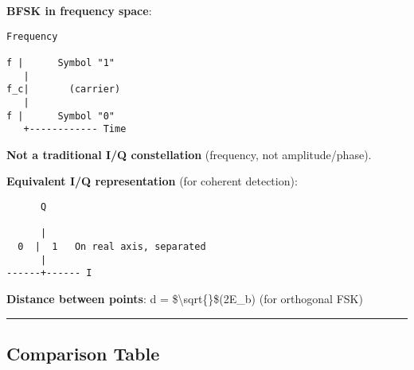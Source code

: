 \textbf{BFSK in frequency space}:

\begin{verbatim}
Frequency
   
f |      Symbol "1"
   |
f_c|       (carrier)
   |
f |      Symbol "0"
   +------------ Time
\end{verbatim}

\textbf{Not a traditional I/Q constellation} (frequency, not
amplitude/phase).

\textbf{Equivalent I/Q representation} (for coherent detection):

\begin{verbatim}
      Q
      
      |
  0  |  1   On real axis, separated
      |
------+------ I
\end{verbatim}

\textbf{Distance between points}: d = \$\textbackslash sqrt\{\}\$(2E\_b)
(for orthogonal FSK)

\begin{center}\rule{0.5\linewidth}{0.5pt}\end{center}

\subsection{\texorpdfstring{ Comparison
Table}{ Comparison Table}}\label{comparison-table}

